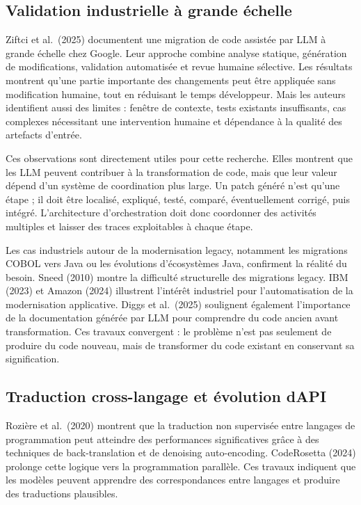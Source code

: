 \subsection{Validation industrielle \`a grande \'echelle}

Ziftci et al.~(2025) documentent une migration de code assistée par LLM à grande échelle chez Google. Leur approche combine analyse statique, génération de modifications, validation automatisée et revue humaine sélective. Les résultats montrent qu'une partie importante des changements peut être appliquée sans modification humaine, tout en réduisant le temps développeur. Mais les auteurs identifient aussi des limites : fenêtre de contexte, tests existants insuffisants, cas complexes nécessitant une intervention humaine et dépendance à la qualité des artefacts d'entrée.

Ces observations sont directement utiles pour cette recherche. Elles montrent que les LLM peuvent contribuer à la transformation de code, mais que leur valeur dépend d'un système de coordination plus large. Un patch généré n'est qu'une étape ; il doit être localisé, expliqué, testé, comparé, éventuellement corrigé, puis intégré. L'architecture d'orchestration doit donc coordonner des activités multiples et laisser des traces exploitables à chaque étape.

Les cas industriels autour de la modernisation legacy, notamment les migrations COBOL vers Java ou les évolutions d'écosystèmes Java, confirment la réalité du besoin. Sneed (2010) montre la difficulté structurelle des migrations legacy. IBM (2023) et Amazon (2024) illustrent l'intérêt industriel pour l'automatisation de la modernisation applicative. Diggs et al.~(2025) soulignent également l'importance de la documentation générée par LLM pour comprendre du code ancien avant transformation. Ces travaux convergent : le problème n'est pas seulement de produire du code nouveau, mais de transformer du code existant en conservant sa signification.

\subsection{Traduction cross-langage et \'evolution d\textquotesingle API}

Rozière et al.~(2020) montrent que la traduction non supervisée entre langages de programmation peut atteindre des performances significatives grâce à des techniques de back-translation et de denoising auto-encoding. CodeRosetta (2024) prolonge cette logique vers la programmation parallèle. Ces travaux indiquent que les modèles peuvent apprendre des correspondances entre langages et produire des traductions plausibles.

